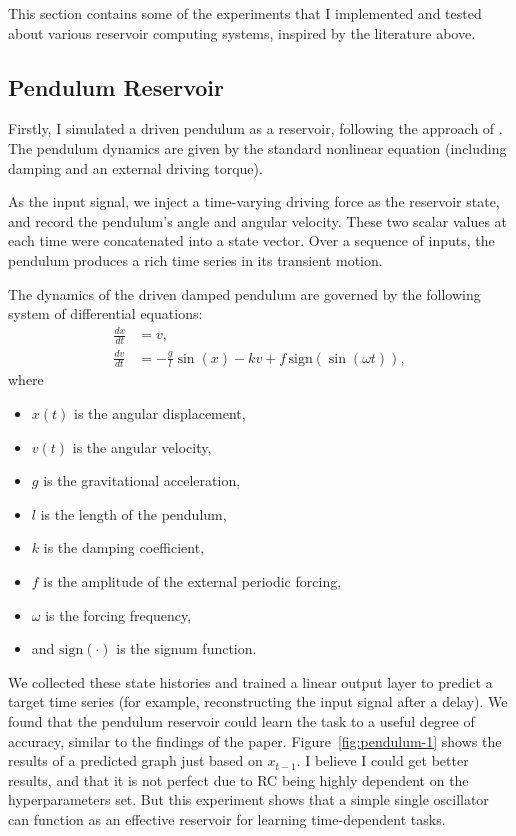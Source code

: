 \documentclass[numbered]{ivt-style/standard}
\begin{document}
This section contains some of the experiments that I implemented and tested about various reservoir computing systems, inspired by the literature above.  

\subsection{Pendulum Reservoir}\label{pendulum_res}
Firstly, I simulated a driven pendulum as a reservoir, following the approach of \cite{Mandal2022}.  The pendulum dynamics are given by the standard nonlinear equation (including damping and an external driving torque). 

As the input signal, we inject a time-varying driving force as the reservoir state, and record the pendulum’s angle and angular velocity.  These two scalar values at each time were concatenated into a state vector.  Over a sequence of inputs, the pendulum produces a rich time series in its transient motion.  

The dynamics of the driven damped pendulum are governed by the following system of differential equations:
\begin{equation}
\begin{aligned}
\frac{dx}{dt} &= v, \\
\frac{dv}{dt} &= -\frac{g}{l} \sin(x) - k v + f \, \text{sign}(\sin(\omega t)),
\end{aligned}
\label{eq:pendulum}
\end{equation}
where
\begin{itemize}
    \item $x(t)$ is the angular displacement,
    \item $v(t)$ is the angular velocity,
    \item $g$ is the gravitational acceleration,
    \item $l$ is the length of the pendulum,
    \item $k$ is the damping coefficient,
    \item $f$ is the amplitude of the external periodic forcing,
    \item $\omega$ is the forcing frequency,
    \item and $\text{sign}(\cdot)$ is the signum function.
\end{itemize}


We collected these state histories and trained a linear output layer to predict a target time series (for example, reconstructing the input signal after a delay).  We found that the pendulum reservoir could learn the task to a useful degree of accuracy, similar to the findings of the paper. Figure~\ref{fig:pendulum-1} shows the results of a predicted graph just based on $x_{t-1}$. I believe I could get better results, and that it is not perfect due to RC being highly dependent on the hyperparameters set. But this experiment shows that a simple single oscillator can function as an effective reservoir for learning time-dependent tasks.
\end{document}
